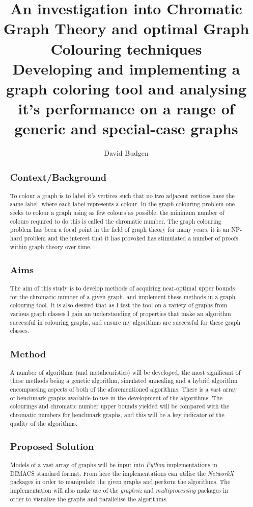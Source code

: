 \documentclass[12pt,a4paper]{article}
\title{An investigation into Chromatic Graph Theory and optimal Graph Colouring techniques\\
  \vspace{0.2cm}\small Developing and implementing a graph coloring tool and analysing it's performance on a range of generic and special-case graphs}
\author{David Budgen}
\date{}
\begin{document}
\maketitle

\begin{abstract}
\subsection*{Context/Background}
\noindent
To colour a graph is to label it's vertices such that no two adjacent vertices have the same label, where each label represents a colour. In the graph colouring problem one seeks to colour a graph using as few colours as possible, the minimum number of colours required to do this is called the chromatic number. The graph colouring problem has been a focal point in the field of graph theory for many years, it is an NP-hard problem and the interest that it has provoked has stimulated a number of proofs within graph theory over time.

\subsection*{Aims}
\noindent
The aim of this study is to develop methods of acquiring near-optimal upper bounds for the chromatic number of a given graph, and implement these methods in a graph colouring tool. It is also desired that as I test the tool on a variety of graphs from various graph classes I gain an understanding of properties that make an algorithm successful in colouring graphs, and ensure my algorithms are successful for these graph classes.

\subsection*{Method}
\noindent
A number of algorithms (and metaheuristics) will be developed, the most significant of these methods being a genetic algorithm, simulated annealing and a hybrid algorithm encompassing aspects of both of the aforementioned algorithms. There is a vast array of benchmark graphs available to use in the development of the algorithms. The colourings and chromatic number upper bounds yielded will be compared with the chromatic numbers for benchmark graphs, and this will be a key indicator of the quality of the algorithms.
\subsection*{Proposed Solution}
\noindent
Models of a vast array of graphs will be input into \textit{Python} implementations in DIMACS standard format. From here the implementations can utilise the \textit{NetworkX} packages in order to manipulate the given graphs and perform the algorithms. The implementation will also make use of the \textit{graphviz} and \textit{multiprocessing} packages in order to visualise the graphs and parallelise the algorithms.
\end{abstract}
\end{document}

